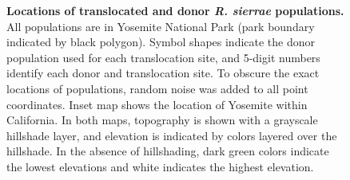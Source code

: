 \documentclass[
  letterpaper,
  DIV=11,
  numbers=noendperiod]{scrartcl}
\begin{document}
\newpage

\begin{figure}


\caption{\label{fig-yosemap}\textbf{Locations of translocated and donor
\emph{R. sierrae} populations.} All populations are in Yosemite National
Park (park boundary indicated by black polygon). Symbol shapes indicate
the donor population used for each translocation site, and 5-digit
numbers identify each donor and translocation site. To obscure the exact
locations of populations, random noise was added to all point
coordinates. Inset map shows the location of Yosemite within California.
In both maps, topography is shown with a grayscale hillshade layer, and
elevation is indicated by colors layered over the hillshade. In the
absence of hillshading, dark green colors indicate the lowest elevations
and white indicates the highest elevation.}

\end{figure}%

\newpage
\end{document}
